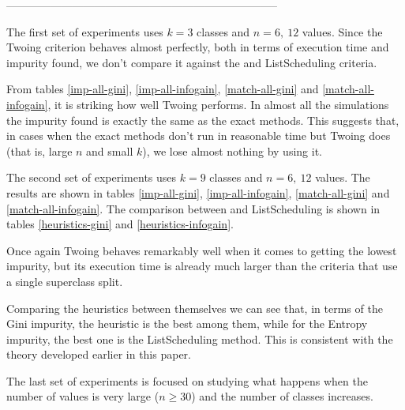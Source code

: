  

--------------------------------------------------------------------------



The first set of experiments uses $k=3$ classes and $n=6,~12$ values. Since the Twoing criterion behaves almost perfectly, both in terms of execution time and impurity found, we don't compare it against the \Alg and ListScheduling criteria.

From tables \ref{imp-all-gini}, \ref{imp-all-infogain}, \ref{match-all-gini} and \ref{match-all-infogain}, it is striking how well Twoing performs. In almost all the simulations the impurity found is exactly the same as the exact methods. This suggests that, in cases when the exact methods don't run in reasonable time but Twoing does (that is, large $n$ and small $k$), we lose almost nothing by using it.



The second set of experiments uses $k=9$ classes and $n=6,~12$ values. The results are shown in tables \ref{imp-all-gini}, \ref{imp-all-infogain}, \ref{match-all-gini} and \ref{match-all-infogain}. The comparison between \Alg and ListScheduling is shown in tables \ref{heuristics-gini} and \ref{heuristics-infogain}.


Once again Twoing behaves remarkably well when it comes to getting the lowest impurity, but its execution time is already much larger than the criteria that use a single superclass split.


Comparing the heuristics between themselves we can see that, in terms of the Gini impurity, the \Alg heuristic is the best among them, while for the Entropy impurity, the best one is the ListScheduling method. This is consistent with the theory developed earlier in this paper.



The last set of experiments is focused on studying what happens when the number of values is very large ($n\ge30$) and the number of classes increases. 

